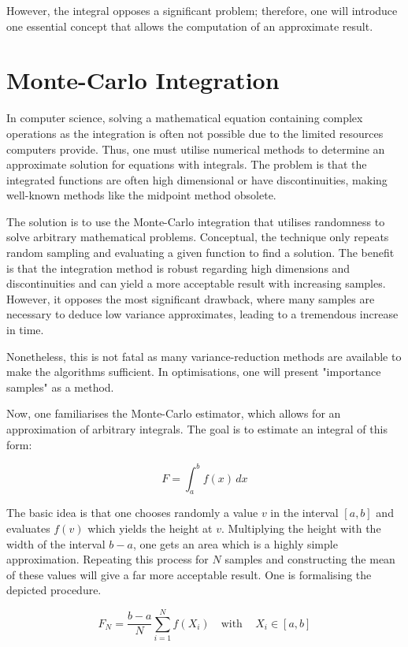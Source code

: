 However, the integral opposes a significant problem; therefore, one will introduce one essential concept that allows the computation of an approximate result.

\section{Monte-Carlo Integration}

In computer science, solving a mathematical equation containing complex operations as the integration is often not possible due to the limited resources computers provide.
Thus, one must utilise numerical methods to determine an approximate solution for equations with integrals.
The problem is that the integrated functions are often high dimensional or have discontinuities, making well-known methods like the midpoint method obsolete.
\cite{pharr_physically_2017}

The solution is to use the Monte-Carlo integration that utilises randomness to solve arbitrary mathematical problems.
Conceptual, the technique only repeats random sampling and evaluating a given function to find a solution.
The benefit is that the integration method is robust regarding high dimensions and discontinuities and can yield a more acceptable result with increasing samples. 
However, it opposes the most significant drawback, where many samples are necessary to deduce low variance approximates, leading to a tremendous increase in time.

Nonetheless, this is not fatal as many variance-reduction methods are available to make the algorithms sufficient.
In optimisations, one will present "importance samples" as a method.
\cite{kalos_monte_2008}

Now, one familiarises the Monte-Carlo estimator, which allows for an approximation of arbitrary integrals.
The goal is to estimate an integral of this form:

$$
F=\int_{a}^{b}f(x)\,dx
$$

The basic idea is that one chooses randomly a value $v$ in the interval $[a,b]$ and evaluates $f(v)$ which yields the height at $v$.
Multiplying the height with the width of the interval $b-a$, one gets an area which is a highly simple approximation.
Repeating this process for $N$ samples and constructing the mean of these values will give a far more acceptable result.
One is formalising the depicted procedure.

$$
F_N=\frac{b-a}{N}\sum_{i=1}^{N}f(X_i)\quad\text{with}\quad\,X_i\in[a,b]
$$

